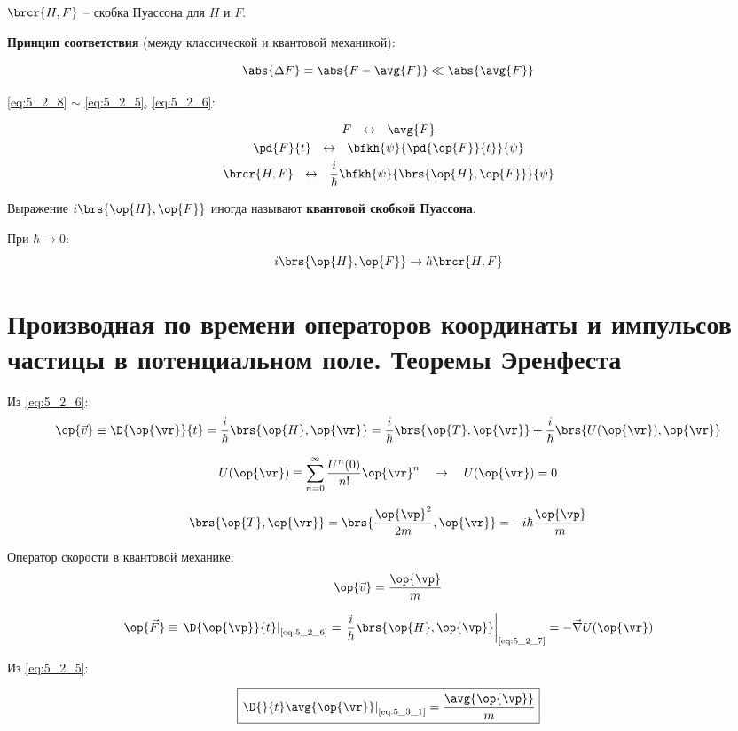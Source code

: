 $\brcr{H, F}$ -- скобка Пуассона для $H$ и $F$.

\textbf{Принцип соответствия} (между классической и квантовой механикой):

$$
\abs{\Delta F} = \abs{F - \avg{F}} \ll \abs{\avg{F}}
$$

\eqref{eq:5_2_8} $\sim$ \eqref{eq:5_2_5}, \eqref{eq:5_2_6}:

$$
\begin{gathered}
F ~~\leftrightarrow~~ \avg{F} \\
\pd{F}{t} ~~\leftrightarrow~~ \bfkh{\psi}{\pd{\op{F}}{t}}{\psi} \\
\brcr{H, F} ~~\leftrightarrow~~ \frac{i}{\hbar} \bfkh{\psi}{ \brs{\op{H}, \op{F}} }{\psi}
\end{gathered}
$$

Выражение $i \brs{\op{H}, \op{F}}$ иногда называют \textbf{квантовой скобкой Пуассона}.

При $\hbar \to 0$:
$$
i \brs{\op{H}, \op{F}} \to \hbar \brcr{H, F}
$$


\section{Производная по времени операторов координаты и импульсов частицы в потенциальном поле. Теоремы Эренфеста}

Из \eqref{eq:5_2_6}:
$$
\op{\vec{v}} \equiv \D{\op{\vr}}{t} = \frac{i}{\hbar} \brs{\op{H}, \op{\vr}} = \frac{i}{\hbar} \brs{\op{T}, \op{\vr}} + \frac{i}{\hbar} \brs{U(\op{\vr}), \op{\vr}}
$$

$$
U(\op{\vr}) \equiv \sum_{n=0}^{\infty} \frac{U^{n}(0)}{n!}\op{\vr}^n ~~~ \to ~~~ U(\op{\vr}) = 0
$$

$$
\brs{\op{T}, \op{\vr}} = \brs{\frac{\op{\vp}^2}{2m}, \op{\vr}} = -i \hbar \frac{\op{\vp}}{m}
$$

Оператор скорости в квантовой механике:
\begin{equation}
\label{eq:5_3_1}
\op{\vec{v}} = \frac{\op{\vp}}{m}
\end{equation}

\begin{equation}
\label{eq:5_3_2}
\op{\vec{F}} \equiv \left. \D{\op{\vp}}{t} \right|_{\text{\eqref{eq:5_2_6}}} = \left. \frac{i}{\hbar} \brs{\op{H}, \op{\vp}} \right|_{\text{\eqref{eq:5_2_7}}} = - \vec{\nabla} U(\op{\vr})
\end{equation}

Из \eqref{eq:5_2_5}:

\begin{equation}
\label{eq:5_3_3}
\boxed {
	\left. \D{}{t}\avg{\op{\vr}} \right|_{\text{\eqref{eq:5_3_1}}} = \frac{\avg{\op{\vp}}}{m}
}
\end{equation}

